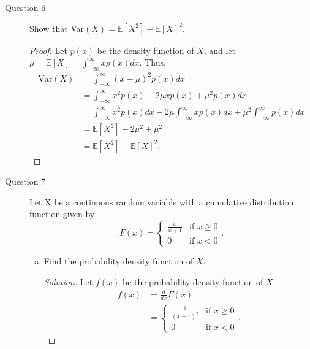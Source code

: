 \documentclass[addpoints, 11pt]{exam}
\newcommand*{\E}{\mathds{E}}
\begin{document}
\begin{description}
    \newpage

    \item[Question 6] Show that Var$(X) = \E[X^2] - \E[X]^2 $.

    \begin{proof}
        Let $p(x)$ be the density function of $X$, and let $\mu = \E[X] = \int^{\infty}_{-\infty} xp(x) dx$. Thus,
        \begin{align*}
            \text{Var}(X) 
            &= \int^{\infty}_{-\infty} (x - \mu)^2p(x) dx \\
            &= \int^{\infty}_{-\infty} x^2p(x) - 2\mu xp(x) + \mu^2p(x) dx \\
            &= \int^{\infty}_{-\infty} x^2p(x) dx - 2\mu\int^{\infty}_{-\infty} xp(x) dx + \mu^2\int^{\infty}_{-\infty} p(x) dx \\
            &= \E[X^2] - 2\mu^2 + \mu^2 \\
            &= \E[X^2] - \E[X]^2.
        \end{align*}
    \end{proof}

    \newpage

    \item[Question 7]  Let X be a continuous random variable with a cumulative distribution function given by
    \[
        F(x) = \begin{cases}
            \frac{x}{x+1} & \text{if }x \geq 0 \\
            0 & \text{if }x < 0
        \end{cases}.
    \]
    \begin{enumerate}[(a)]
        \item Find the probability density function of $X$.
        \begin{proof}[Solution]
            Let $f(x)$ be the probability density function of $X$.
            \begin{align*}
                f(x)
                &= \frac{d}{dx}F(x) \\
                &= \begin{cases}
                        \frac{1}{(x+1)^2} & \text{if }x \geq 0 \\
                        0 & \text{if }x < 0
                    \end{cases}.
            \end{align*}
        \end{proof}


\end{enumerate}
\end{description}
\end{document}
